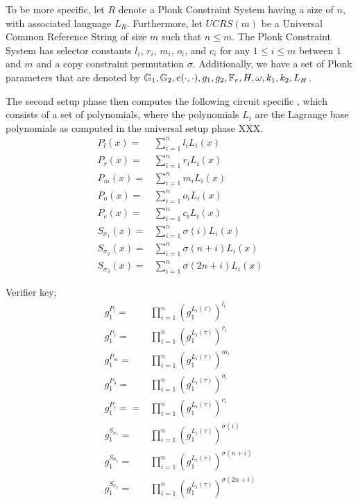 To be more specific, let $R$ denote a Plonk Constraint System having a size of $n$, with associated language $L_R$. Furthermore, let $UCRS(m)$ be a Universal Common Reference String of size $m$ such that $n\leq m$. The Plonk Constraint System has selector constants $l_i$, $r_i$, $m_i$, $o_i$, and $c_i$ for any $1\leq i \leq m$ between $1$ and $m$ and a copy constraint permutation $\sigma$. Additionally, we have a set of Plonk parameters that are denoted by ${\mathbb{G}_1, \mathbb{G}_2, e(\cdot,\cdot), g_1, g_2, \mathbb{F}_r, H, \omega, k_1, k_2, L_H}$.

The second setup phase then computes the following circuit specific , which consists of a set of polynomials, where the polynomials $L_i$ are the Lagrange base polynomials as computed in the universal setup phase XXX.
\begin{equation}
\label{def:plonk-circuit-crs}
\begin{array}{rl}
P_{l}(x) = &\sum_{i=1}^{n} {l_i}L_i(x)\\
P_{r}(x) = &\sum_{i=1}^{n} {r_i}L_i(x)\\
P_{m}(x) = &\sum_{i=1}^{n} {m_i}L_i(x)\\
P_{o}(x) = &\sum_{i=1}^{n} {o_i}L_i(x)\\
P_{c}(x) = &\sum_{i=1}^{n} {c_i}L_i(x)\\
S_{\sigma_1}(x) =& \sum_{i=1}^{n} \sigma(i)L_i(x)\\
S_{\sigma_2}(x) =& \sum_{i=1}^{n} \sigma(n+i)L_i(x)\\
S_{\sigma_3}(x) =& \sum_{i=1}^{n} \sigma(2n+i)L_i(x)
\end{array}
\end{equation}

Verifier key;
\begin{equation}
\label{def:plonk-circuit-crs}
\begin{array}{rl}
g_1^{P_l} = &\prod_{i=1}^{n} \left(g_1^{L_i(\tau)}\right)^{l_i}\\
g_1^{P_r} = &\prod_{i=1}^{n} \left(g_1^{L_i(\tau)}\right)^{r_i}\\
g_1^{P_m} = &\prod_{i=1}^{n} \left(g_1^{L_i(\tau)}\right)^{m_i}\\
g_1^{P_o} = &\prod_{i=1}^{n} \left(g_1^{L_i(\tau)}\right)^{o_i}\\
g_1^{P_c} = = &\prod_{i=1}^{n} \left(g_1^{L_i(\tau)}\right)^{c_i}\\
g_1^{S_{\sigma_1}} = &\prod_{i=1}^{n} \left(g_1^{L_i(\tau)}\right)^{\sigma(i)}\\
g_1^{S_{\sigma_2}} = &\prod_{i=1}^{n} \left(g_1^{L_i(\tau)}\right)^{\sigma(n+i)}\\
g_1^{S_{\sigma_3}} = &\prod_{i=1}^{n} \left(g_1^{L_i(\tau)}\right)^{\sigma(2n+i)}
\end{array}
\end{equation}

